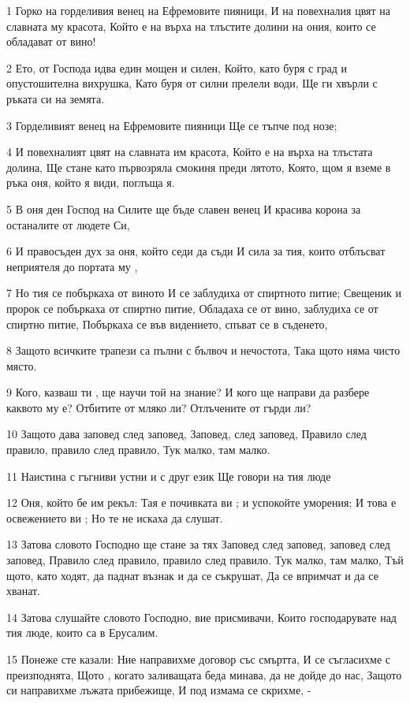 \par 1 Горко на горделивия венец на Ефремовите пияници, И на повехналия цвят на славната му красота, Който е на върха на тлъстите долини на ония, които се обладават от вино!
\par 2 Ето, от Господа идва един мощен и силен, Който, като буря с град и опустошителна вихрушка, Като буря от силни прелели води, Ще ги хвърли с ръката си на земята.
\par 3 Горделивият венец на Ефремовите пияници Ще се тъпче под нозе;
\par 4 И повехналият цвят на славната им красота, Който е на върха на тлъстата долина, Ще стане като първозряла смокиня преди лятото, Която, щом я вземе в ръка оня, който я види, поглъща я.
\par 5 В оня ден Господ на Силите ще бъде славен венец И красива корона за останалите от людете Си,
\par 6 И правосъден дух за оня, който седи да съди И сила за тия, които отблъсват неприятеля до портата му ,
\par 7 Но тия се побъркаха от виното И се заблудиха от спиртното питие; Свещеник и пророк се побъркаха от спиртно питие, Обладаха се от вино, заблудиха се от спиртно питие, Побъркаха се във видението, спъват се в съденето,
\par 8 Защото всичките трапези са пълни с бълвоч и нечостота, Така щото няма чисто място.
\par 9 Кого, казваш ти , ще научи той на знание? И кого ще направи да разбере каквото му е? Отбитите от мляко ли? Отлъчените от гърди ли?
\par 10 Защото дава заповед след заповед, Заповед, след заповед, Правило след правило, правило след правило, Тук малко, там малко.
\par 11 Наистина с гъгниви устни и с друг език Ще говори на тия люде
\par 12 Оня, който бе им рекъл: Тая е почивката ви ; и успокойте уморения; И това е освежението ви ; Но те не искаха да слушат.
\par 13 Затова словото Господно ще стане за тях Заповед след заповед, заповед след заповед, Правило след правило, правило след правило. Тук малко, там малко, Тъй щото, като ходят, да паднат възнак и да се съкрушат, Да се впримчат и да се хванат.
\par 14 Затова слушайте словото Господно, вие присмивачи, Които господарувате над тия люде, които са в Ерусалим.
\par 15 Понеже сте казали: Ние направихме договор със смъртта, И се съгласихме с преизподнята, Щото , когато заливащата беда минава, да не дойде до нас, Защото си направихме лъжата прибежище, И под измама се скрихме, -
